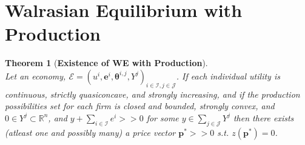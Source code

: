 \documentclass[dvips,11pt]{article}
\newcommand{\R}{\mathbb{R}}
\let\bf\oldbf
\let\bf\textbf
\DeclareMathOperator{\?}{\,?\,}
\newtheorem{theorem}{Theorem}[section]
\begin{document}
\section{Walrasian Equilibrium with Production}
\begin{theorem}[\bf{Existence of WE with Production}]\hfill
\\Let an economy, $\mathcal{E} = (u^i,\bf{e}^i, \boldsymbol{\theta}^{i,j}, Y^j)_{i\in\mathcal{I}, j \in \mathcal{J}}$. If each individual utility is continuous, strictly quasiconcave, and strongly increasing, and if the production possibilities set for each firm is closed and bounded, strongly convex, and $0 \in Y^j \subset \R^n$, and $y + \sum_{i\in\mathcal{I}}e^i >> 0$ for some $y \in \sum_{j \in \mathcal{J}}Y^j$ then there exists (atleast one and possibly many) a price vector $\bf{p}^* >> 0$ s.t. $z(\bf{p}^*) = 0$.
\end{theorem}
\end{document}
